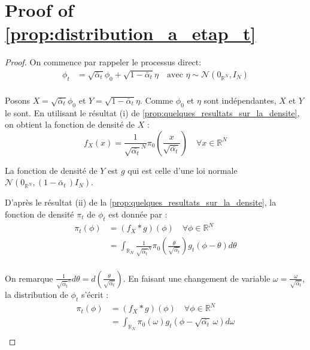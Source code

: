 \documentclass[a4paper,10pt]{article}
\theoremstyle{definition} %
\theoremstyle{definition} %
\theoremstyle{definition} %
\theoremstyle{definition} %
\newcommand{\E}[1]{\mathbb{E}\left[#1\right]}
\newcommand{\R}{\mathbb{R}}
\begin{document}
\section{Proof of \cref{prop:distribution_a_etap_t}} \label{sec:proof_distribution_a_etap_t}
\begin{proof}
    On commence par rappeler le processus direct:
    \begin{align*}
    \phi_t &= \sqrt{\bar \alpha_t}\phi_0 + \sqrt{1-\bar \alpha_t} \eta \quad \text{avec } \eta \sim \mathcal{N}(0_{\R^N},I_N)\\
    \end{align*}

    Posons $X = \sqrt{\bar \alpha_t}\phi_0$ et $Y = \sqrt{1-\bar \alpha_t} \eta$. Comme $\phi_0$ et $\eta$ sont indépendantes, $X$ et $Y$ le sont. En utilisant le résultat (i) de \cref{prop:quelques_resultats_sur_la_densite}, on obtient la fonction de densité de $X$ :
    \[f_X(x) = \frac{1}{\sqrt{\bar{\alpha_t}}^N} \pi_0\left(\frac{x}{\sqrt{\bar{\alpha_t}}}\right) \quad\forall x \in \R^N\]

    La fonction de densité de $Y$ est $g$ qui est celle d'une loi normale $\mathcal{N}\left(0_{\R^N}, (1-\bar \alpha _t\,)I_N\right)$.

    D'après le résultat (ii) de la  \cref{prop:quelques_resultats_sur_la_densite}, la fonction de densité $\pi_t$ de $\phi_t$ est donnée par :
    \begin{align*}
        \pi_t(\phi) &= (f_X*g)(\phi) \quad \forall\phi\in \R^N \\
        &= \int_{\R_N} \frac{1}{\sqrt{\bar{\alpha_t}}^N} \pi_0\left(\frac{\theta}{\sqrt{\bar{\alpha_t}}}\right) g_t(\phi -\theta) d\theta\\
    \end{align*}

    On remarque $\frac{1}{\sqrt{\bar{\alpha_t}}^n} d\theta = d\left(\frac{\theta}{\sqrt{\bar{\alpha_t}}}\right)$. En faisant une changement de variable $\omega = \frac{\omega}{\sqrt{\bar{\alpha_t}}}$, la distribution de $\phi_t$ s'écrit :
    \begin{align*}
        \pi_t(\phi) &= (f_X*g)(\phi) \quad \forall\phi\in \R^N \\
        &= \int_{\R_N}  \pi_0(\omega) g_t(\phi -\sqrt{\bar{\alpha_t}}\,\omega) d\omega\\
    \end{align*}
\end{proof}

\end{document}

